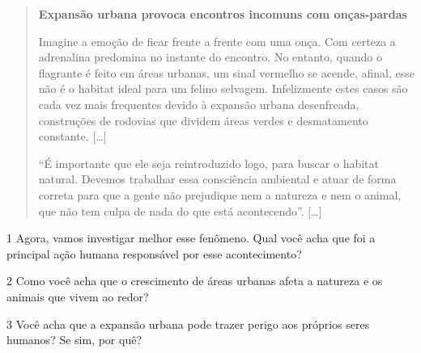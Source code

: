 \begin{quote}
\textbf{Expansão urbana provoca encontros incomuns com onças-pardas}

Imagine a emoção de ficar frente a frente com uma onça. Com certeza a
adrenalina predomina no instante do encontro. No entanto, quando o
flagrante é feito em áreas urbanas, um sinal vermelho se acende, afinal,
esse não é o habitat ideal para um felino selvagem. Infelizmente estes
casos são cada vez mais frequentes devido à expansão urbana desenfreada,
construções de rodovias que dividem áreas verdes e desmatamento
constante. {[}\ldots{}{]}

“É importante que ele seja reintroduzido logo, para buscar o habitat
natural. Devemos trabalhar essa consciência ambiental e atuar de forma
correta para que a gente não prejudique nem a natureza e nem o animal,
que não tem culpa de nada do que está acontecendo”. {[}\ldots{}{]}

\end{quote}

\num{1} Agora, vamos investigar melhor esse fenômeno. Qual você acha que foi a principal ação humana responsável por esse acontecimento?


\num{2} Como você acha que o crescimento de áreas urbanas afeta a natureza e os
animais que vivem ao redor?


\num{3} Você acha que a expansão urbana pode trazer perigo aos próprios seres
humanos? Se sim, por quê?



